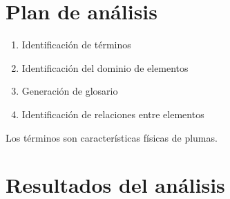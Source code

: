 \documentclass[a4paper,12pt]{article}
\begin{document}
\section{Plan de análisis}
\begin{enumerate}
	\item Identificación de términos
	\item Identificación del dominio de elementos
	\item Generación de glosario
	\item Identificación de relaciones entre elementos
\end{enumerate}
Los términos son características físicas de plumas.

\section{Resultados del análisis}
\end{document}

